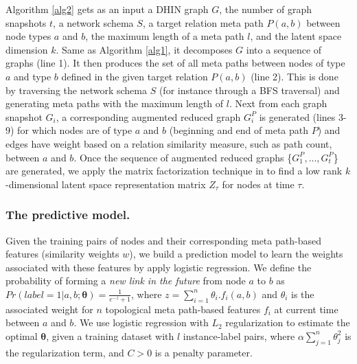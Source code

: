 Algorithm \ref{alg2} gets as an input a DHIN graph $G$, the number of graph snapshots $t$, a network schema $S$, a target relation meta path $P(a,b)$ between node types $a$ and $b$, the maximum length of a meta path $l$, and the latent space dimension $k$. Same as Algorithm \ref{alg1}, it decomposes $G$ into a sequence of graphs (line 1). It then produces the set of all meta paths between nodes of type $a$ and type $b$ defined in the given target relation $P(a,b)$ (line 2). This is done by traversing the network schema $S$ (for instance through a BFS traversal) and generating meta paths with the maximum length of $l$. Next from each graph snapshot $G_i$, a corresponding augmented reduced graph $G^P_i$ is generated (lines 3-9) for which nodes are of type $a$ and $b$ (beginning and end of meta path $P$) and edges have weight based on a relation similarity measure, such as path count, between $a$ and $b$. Once the sequence of augmented reduced graphs \{$G^P_1, ..., G^P_t$\} are generated, we apply the matrix factorization technique in \cite{Zhu2016} to find a low rank $k$-dimensional latent space representation matrix $Z_\tau$ for nodes at time $\tau$.






\subsubsection{The predictive model.} Given the training pairs of nodes and their corresponding meta path-based features (similarity weights $w$), we build a prediction model to learn the weights associated with these features by apply logistic regression. We define the probability of forming a \textit{new link in the future} from node $a$ to $b$ as $Pr(label=1|a, b; \boldsymbol{\theta}) = \frac{1}{e^{-z}+1}$, where $z=\sum\limits_{i=1}^{n}\theta_i.f_i(a,b)$ and $\theta_i$ is the associated weight for $n$ topological meta path-based features $f_i$ at current time between $a$ and $b$. We use logistic regression with $L_2$ regularization to estimate the optimal $\boldsymbol{\theta}$, given a training dataset with $l$ instance-label pairs, where $\alpha \sum_{j=1}^n \theta_j^2$ is the regularization term, and $C>0$ is a penalty parameter. 


